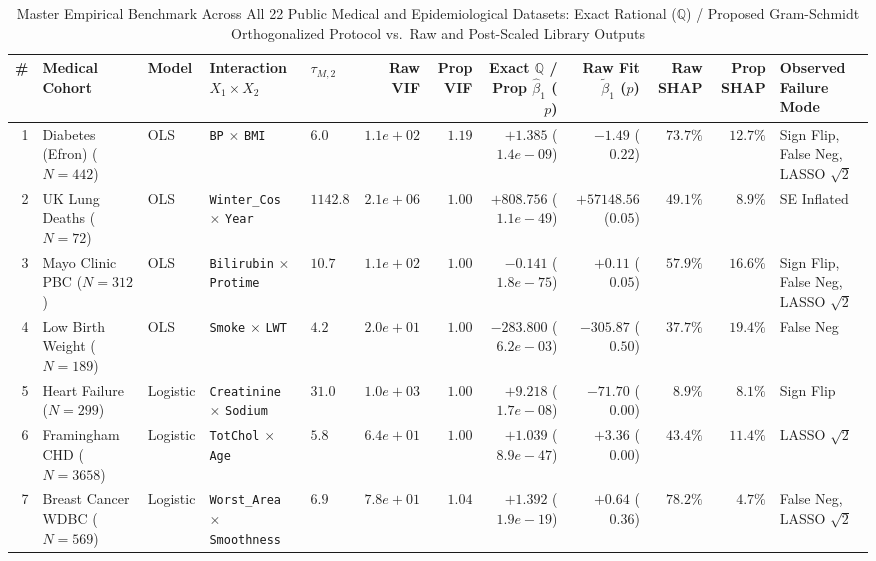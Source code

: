 \begin{table}[htbp]
\centering
\caption{Master Empirical Benchmark Across All 22 Public Medical and Epidemiological Datasets: Exact Rational ($\mathbb{Q}$) / Proposed Gram-Schmidt Orthogonalized Protocol vs.\ Raw and Post-Scaled Library Outputs}
\label{tab:master_22_medical_cases}
\scriptsize
\setlength{\tabcolsep}{3.5pt}
\begin{tabular}{rllllrrrrrrl}
\toprule
\textbf{\#} & \textbf{Medical Cohort} & \textbf{Model} & \textbf{Interaction $X_1 \times X_2$} & \textbf{$\tau_{M,2}$} & \textbf{Raw VIF} & \textbf{Prop VIF} & \textbf{Exact $\mathbb{Q}$ / Prop $\hat{\beta}_1$ ($p$)} & \textbf{Raw Fit $\tilde{\beta}_1$ ($p$)} & \textbf{Raw SHAP} & \textbf{Prop SHAP} & \textbf{Observed Failure Mode} \\
\midrule
1 & Diabetes (Efron) \cite{Efron2004} ($N=442$) & OLS & \texttt{BP} $\times$ \texttt{BMI} & $6.0$ & $1.1e+02$ & $\bm{1.19}$ & $\bm{+1.385}$ ($1.4e-09$) & $-1.49$ ($\bm{0.22}$) & $73.7\%$ & $\bm{12.7\%}$ & Sign Flip, False Neg, LASSO $\sqrt{2}$ \\
2 & UK Lung Deaths \cite{Venables2002} ($N=72$) & OLS & \texttt{Winter\_Cos} $\times$ \texttt{Year} & $1142.8$ & $2.1e+06$ & $\bm{1.00}$ & $\bm{+808.756}$ ($1.1e-49$) & $+57148.56$ ($\bm{0.05}$) & $49.1\%$ & $\bm{8.9\%}$ & SE Inflated \\
3 & Mayo Clinic PBC \cite{Cox1972} ($N=312$) & OLS & \texttt{Bilirubin} $\times$ \texttt{Protime} & $10.7$ & $1.1e+02$ & $\bm{1.00}$ & $\bm{-0.141}$ ($1.8e-75$) & $+0.11$ ($\bm{0.05}$) & $57.9\%$ & $\bm{16.6\%}$ & Sign Flip, False Neg, LASSO $\sqrt{2}$ \\
4 & Low Birth Weight \cite{Venables2002} ($N=189$) & OLS & \texttt{Smoke} $\times$ \texttt{LWT} & $4.2$ & $2.0e+01$ & $\bm{1.00}$ & $\bm{-283.800}$ ($6.2e-03$) & $-305.87$ ($\bm{0.50}$) & $37.7\%$ & $\bm{19.4\%}$ & False Neg \\
5 & Heart Failure \cite{Chicco2020} ($N=299$) & Logistic & \texttt{Creatinine} $\times$ \texttt{Sodium} & $31.0$ & $1.0e+03$ & $\bm{1.00}$ & $\bm{+9.218}$ ($1.7e-08$) & $-71.70$ ($\bm{0.00}$) & $8.9\%$ & $\bm{8.1\%}$ & Sign Flip \\
6 & Framingham CHD \cite{Kannel1961} ($N=3658$) & Logistic & \texttt{TotChol} $\times$ \texttt{Age} & $5.8$ & $6.4e+01$ & $\bm{1.00}$ & $\bm{+1.039}$ ($8.9e-47$) & $+3.36$ ($\bm{0.00}$) & $43.4\%$ & $\bm{11.4\%}$ & LASSO $\sqrt{2}$ \\
7 & Breast Cancer WDBC \cite{Street1993} ($N=569$) & Logistic & \texttt{Worst\_Area} $\times$ \texttt{Smoothness} & $6.9$ & $7.8e+01$ & $\bm{1.04}$ & $\bm{+1.392}$ ($1.9e-19$) & $+0.64$ ($\bm{0.36}$) & $78.2\%$ & $\bm{4.7\%}$ & False Neg, LASSO $\sqrt{2}$ \\

\end{tabular}
\end{table}
